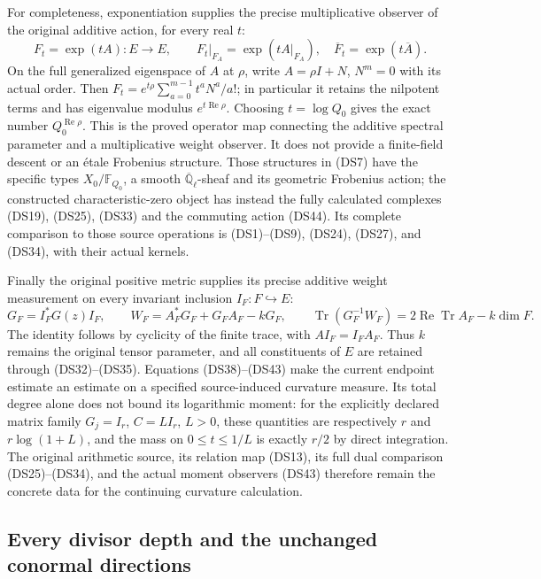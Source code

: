 \documentclass{article}
\begin{document}
For completeness, exponentiation supplies the precise multiplicative
observer of the original additive action, for every real $t$:
\[
 F_t=\exp(tA):E\to E,\qquad
 F_t|_{F_A}=\exp(tA|_{F_A}),\quad
 \overline F_t=\exp(t\overline A).
 \tag{DS44}
\]
On the full generalized eigenspace of $A$ at $\rho$, write
$A=\rho I+N$, $N^m=0$ with its actual order.  Then
$F_t=e^{t\rho}\sum_{a=0}^{m-1}t^aN^a/a!$; in particular it
retains the nilpotent terms and has eigenvalue modulus
$e^{t\operatorname{Re}\rho}$.  Choosing $t=\log Q_0$ gives the exact
number $Q_0^{\operatorname{Re}\rho}$.  This is the proved operator
map connecting the additive spectral parameter and a multiplicative
weight observer.  It does not provide a finite-field descent or an
\'{e}tale Frobenius structure.  Those structures in (DS7) have the
specific types $X_0/\mathbb F_{Q_0}$, a smooth
$\overline{\mathbb Q}_\ell$-sheaf and its geometric Frobenius action;
the constructed characteristic-zero object has instead the fully
calculated complexes (DS19), (DS25), (DS33) and the commuting action
(DS44).  Its complete comparison to those source operations is
(DS1)--(DS9), (DS24), (DS27), and (DS34), with their actual kernels.

Finally the original positive metric supplies its precise additive
weight measurement on every invariant inclusion $I_F:F\hookrightarrow E$:
\[
 G_F=I_F^*G(z)I_F,\qquad
 W_F=A_F^*G_F+G_FA_F-kG_F,
 \qquad
 \operatorname{Tr}(G_F^{-1}W_F)=
 2\operatorname{Re}\operatorname{Tr}A_F-k\dim F.
 \tag{DS45}
\]
The identity follows by cyclicity of the finite trace, with
$AI_F=I_FA_F$.  Thus $k$ remains the original tensor parameter,
and all constituents of $E$ are retained through (DS32)--(DS35).
Equations (DS38)--(DS43) make the current endpoint estimate an
estimate on a specified source-induced curvature measure.  Its total
degree alone does not bound its logarithmic moment: for the explicitly
declared matrix family $G_j=I_r$, $C=LI_r$, $L>0$, these quantities
are respectively $r$ and $r\log(1+L)$, and the mass on
$0\leq t\leq1/L$ is exactly $r/2$ by direct integration.
The original arithmetic source, its relation map (DS13), its full
dual comparison (DS25)--(DS34), and the actual moment observers
(DS43) therefore remain the concrete data for the continuing
curvature calculation.

\subsection{Every divisor depth and the unchanged conormal directions}
\end{document}
